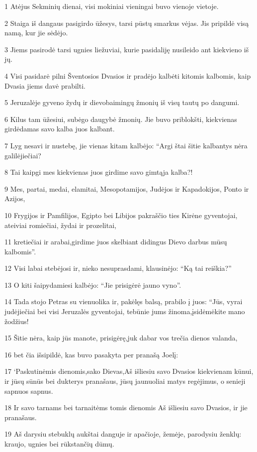 \par 1 Atėjus Sekminių dienai, visi mokiniai vieningai buvo vienoje vietoje. 
\par 2 Staiga iš dangaus pasigirdo ūžesys, tarsi pūstų smarkus vėjas. Jis pripildė visą namą, kur jie sėdėjo. 
\par 3 Jiems pasirodė tarsi ugnies liežuviai, kurie pasidaliję nusileido ant kiekvieno iš jų. 
\par 4 Visi pasidarė pilni Šventosios Dvasios ir pradėjo kalbėti kitomis kalbomis, kaip Dvasia jiems davė prabilti. 
\par 5 Jeruzalėje gyveno žydų ir dievobaimingų žmonių iš visų tautų po dangumi. 
\par 6 Kilus tam ūžesiui, subėgo daugybė žmonių. Jie buvo priblokšti, kiekvienas girdėdamas savo kalba juos kalbant. 
\par 7 Lyg nesavi ir nustebę, jie vienas kitam kalbėjo: “Argi štai šitie kalbantys nėra galilėjiečiai? 
\par 8 Tai kaipgi mes kiekvienas juos girdime savo gimtąja kalba?! 
\par 9 Mes, partai, medai, elamitai, Mesopotamijos, Judėjos ir Kapadokijos, Ponto ir Azijos, 
\par 10 Frygijos ir Pamfilijos, Egipto bei Libijos pakraščio ties Kirėne gyventojai, ateiviai romiečiai, žydai ir prozelitai, 
\par 11 kretiečiai ir arabai,­girdime juos skelbiant didingus Dievo darbus mūsų kalbomis”. 
\par 12 Visi labai stebėjosi ir, nieko nesuprasdami, klausinėjo: “Ką tai reiškia?” 
\par 13 O kiti šaipydamiesi kalbėjo: “Jie prisigėrė jauno vyno”. 
\par 14 Tada stojo Petras su vienuolika ir, pakėlęs balsą, prabilo į juos: “Jūs, vyrai judėjiečiai bei visi Jeruzalės gyventojai, tebūnie jums žinoma,­įsidėmėkite mano žodžius! 
\par 15 Šitie nėra, kaip jūs manote, prisigėrę,­juk dabar vos trečia dienos valanda,­ 
\par 16 bet čia išsipildė, kas buvo pasakyta per pranašą Joelį: 
\par 17 ‘Paskutinėmis dienomis,­sako Dievas,­Aš išliesiu savo Dvasios kiekvienam kūnui, ir jūsų sūnūs bei dukterys pranašaus, jūsų jaunuoliai matys regėjimus, o senieji sapnuos sapnus. 
\par 18 Ir savo tarnams bei tarnaitėms tomis dienomis Aš išliesiu savo Dvasios, ir jie pranašaus. 
\par 19 Aš darysiu stebuklų aukštai danguje ir apačioje, žemėje, parodysiu ženklų: kraujo, ugnies bei rūkstančių dūmų. 

